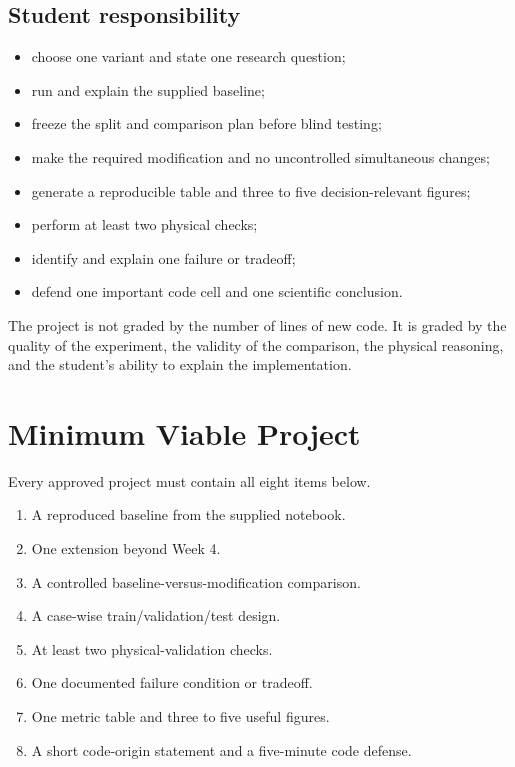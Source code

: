 \documentclass[11pt]{article}
\begin{document}
\subsection{Student responsibility}
\begin{itemize}
\item choose one variant and state one research question;
\item run and explain the supplied baseline;
\item freeze the split and comparison plan before blind testing;
\item make the required modification and no uncontrolled simultaneous changes;
\item generate a reproducible table and three to five decision-relevant figures;
\item perform at least two physical checks;
\item identify and explain one failure or tradeoff;
\item defend one important code cell and one scientific conclusion.
\end{itemize}

\begin{summarybox}
The project is not graded by the number of lines of new code. It is graded by the quality of the experiment, the validity of the comparison, the physical reasoning, and the student's ability to explain the implementation.
\end{summarybox}

\section{Minimum Viable Project}
Every approved project must contain all eight items below.
\begin{enumerate}
\item A reproduced baseline from the supplied notebook.
\item One extension beyond Week 4.
\item A controlled baseline-versus-modification comparison.
\item A case-wise train/validation/test design.
\item At least two physical-validation checks.
\item One documented failure condition or tradeoff.
\item One metric table and three to five useful figures.
\item A short code-origin statement and a five-minute code defense.
\end{enumerate}
\end{document}
